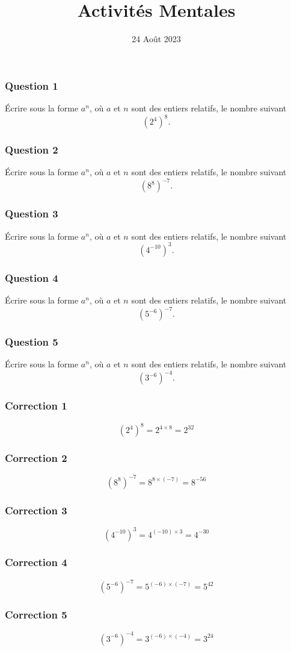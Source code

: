 \documentclass[15pt, mathserif]{beamer}
\title{Activités Mentales}
\date{24 Août 2023}
\begin{document}
\begin{frame}
    \titlepage
\end{frame}

\begin{frame} 
	\frametitle{Question 1}
	Écrire sous la forme $a^n$, où $a$ et $n$ sont des entiers relatifs, le nombre suivant \[\left( 2^{4} \right) ^{ 8}. \]\end{frame}


\begin{frame} 
	\frametitle{Question 2}
	Écrire sous la forme $a^n$, où $a$ et $n$ sont des entiers relatifs, le nombre suivant \[\left( 8^{8} \right) ^{ -7}. \]\end{frame}


\begin{frame} 
	\frametitle{Question 3}
	Écrire sous la forme $a^n$, où $a$ et $n$ sont des entiers relatifs, le nombre suivant \[\left( 4^{-10} \right) ^{ 3}. \]\end{frame}


\begin{frame} 
	\frametitle{Question 4}
	Écrire sous la forme $a^n$, où $a$ et $n$ sont des entiers relatifs, le nombre suivant \[\left( 5^{-6} \right) ^{ -7}. \]\end{frame}


\begin{frame} 
	\frametitle{Question 5}
	Écrire sous la forme $a^n$, où $a$ et $n$ sont des entiers relatifs, le nombre suivant \[\left( 3^{-6} \right) ^{ -4}. \]\end{frame}


\begin{frame}
\vspace{-10mm}
	\frametitle{Correction 1}
\[\left( 2^{4}\right)^{8} =2^{4 \times 8} = 2^{32}\]
\end{frame}


\begin{frame}
\vspace{-10mm}
	\frametitle{Correction 2}
\[\left( 8^{8}\right)^{-7} =8^{8 \times \left(-7\right)} = 8^{-56}\]
\end{frame}


\begin{frame}
\vspace{-10mm}
	\frametitle{Correction 3}
\[\left( 4^{-10}\right)^{3} =4^{\left(-10\right) \times 3} = 4^{-30}\]
\end{frame}


\begin{frame}
\vspace{-10mm}
	\frametitle{Correction 4}
\[\left( 5^{-6}\right)^{-7} =5^{\left(-6\right) \times \left(-7\right)} = 5^{42}\]
\end{frame}


\begin{frame}
\vspace{-10mm}
	\frametitle{Correction 5}
\[\left( 3^{-6}\right)^{-4} =3^{\left(-6\right) \times \left(-4\right)} = 3^{24}\]
\end{frame}
\end{document}
